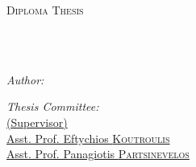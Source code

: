 \documentclass[
	12pt, %
	english, %
	onehalfspacing, %
	liststotoc, %
	toctotoc, %
	parskip, %
	headsepline, %
]{MastersDoctoralThesis} %
\author{Christos \textsc{Spyridakis}} %
\begin{document}
\frontmatter %

\pagestyle{plain} %

\begin{titlepage}
	\begin{center}

		\vspace*{.018\textheight}
		{\scshape\LARGE \univname\par}\vspace{0.7cm} %
		\textsc{\Large Diploma Thesis}\\[0.5cm] %

		\HRule \\[0.4cm] %
		{\huge \bfseries \ttitle\par}\vspace{0.4cm} %
		\HRule \\[0.1cm] %

		\begin{minipage}[t]{0.32\textwidth}
			\begin{flushleft} \large
				\emph{Author:}\\
				\href{https://www.linkedin.com/in/cspyridakis}{\authorname} %
			\end{flushleft}
		\end{minipage}
		\begin{minipage}[t]{0.58\textwidth}
			\begin{flushright} \large
				\emph{Thesis Committee:} \\
				\href{https://www.ece.tuc.gr/index.php?id=4531&tx_tuclabspersonnel_list%5Bperson%5D=289&tx_tuclabspersonnel_list%5Baction%5D=person&tx_tuclabspersonnel_list%5Bcontroller%5D=List}{\supname \hspace{.1cm}(Supervisor)}\\ %
				\href{https://www.ece.tuc.gr/index.php?id=4531&tx_tuclabspersonnel_list%5Bperson%5D=79&tx_tuclabspersonnel_list%5Baction%5D=person&tx_tuclabspersonnel_list%5Bcontroller%5D=List}{Asst. Prof. Eftychios \textsc{Koutroulis}}\\
				\href{https://www.tuc.gr/index.php?id=5643&tx_tuclabspersonnel_pi3%5Bpersonid%5D=347}{Asst. Prof. Panagiotis \textsc{Partsinevelos}}
			\end{flushright}
		\end{minipage}\\[0.42cm]


\end{center}
\end{titlepage}
\end{document}
